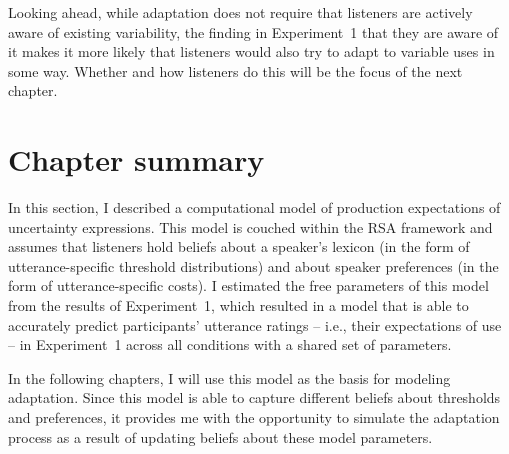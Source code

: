 Looking ahead, while adaptation does not require that listeners are actively aware of existing variability, the finding in Experiment~1 that they are
aware of it makes it more likely that listeners would also try to adapt to variable uses in some way. Whether and how listeners do this 
will be the focus of the next chapter.

\section{Chapter summary}

In this section, I described a computational model of production expectations of uncertainty expressions. This model
is couched within the RSA framework and assumes that listeners hold beliefs about a speaker's lexicon (in the form
of utterance-specific threshold distributions) and about speaker preferences (in the form of utterance-specific costs). I estimated 
the free parameters of this model from the results of Experiment~1, which resulted in a model that is able to accurately predict
participants' utterance ratings -- i.e., their expectations of use --  in Experiment~1 across all conditions with a shared set of parameters.

In the following chapters, I will use this model as the basis for modeling adaptation. Since this model
is able to capture different beliefs about thresholds and preferences, it provides me with the opportunity to simulate 
the adaptation process as a result of updating beliefs about these model parameters.

